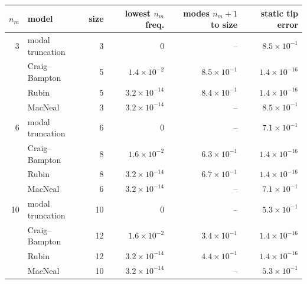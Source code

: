 \begin{tabular}{rlrrrr}
\toprule
$n_m$ & model & size & lowest $n_m$ freq. & modes $n_m{+}1$ to size & static tip error \\
\midrule
3 & modal truncation & 3 & 0 & -- & $8.5\times10^{-1}$ \\
 & Craig--Bampton & 5 & $1.4\times10^{-2}$ & $8.5\times10^{-1}$ & $1.4\times10^{-16}$ \\
 & Rubin & 5 & $3.2\times10^{-14}$ & $8.4\times10^{-1}$ & $1.4\times10^{-16}$ \\
 & MacNeal & 3 & $3.2\times10^{-14}$ & -- & $8.5\times10^{-1}$ \\
\midrule
6 & modal truncation & 6 & 0 & -- & $7.1\times10^{-1}$ \\
 & Craig--Bampton & 8 & $1.6\times10^{-2}$ & $6.3\times10^{-1}$ & $1.4\times10^{-16}$ \\
 & Rubin & 8 & $3.2\times10^{-14}$ & $6.7\times10^{-1}$ & $1.4\times10^{-16}$ \\
 & MacNeal & 6 & $3.2\times10^{-14}$ & -- & $7.1\times10^{-1}$ \\
\midrule
10 & modal truncation & 10 & 0 & -- & $5.3\times10^{-1}$ \\
 & Craig--Bampton & 12 & $1.6\times10^{-2}$ & $3.4\times10^{-1}$ & $1.4\times10^{-16}$ \\
 & Rubin & 12 & $3.2\times10^{-14}$ & $4.4\times10^{-1}$ & $1.4\times10^{-16}$ \\
 & MacNeal & 10 & $3.2\times10^{-14}$ & -- & $5.3\times10^{-1}$ \\
\bottomrule
\end{tabular}
